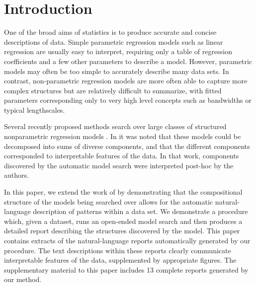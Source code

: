 \documentclass{article}
\def\ie{i.e.\ }
\def\eg{e.g.\ }
\begin{document}
\allowdisplaybreaks

\section{Introduction}

One of the broad aims of statistics is to produce accurate and concise descriptions of data.
Simple parametric regression models such as linear regression are usually easy to interpret, requiring only a table of regression coefficients and a few other parameters to describe a model.
However, parametric models may often be too simple to accurately describe many data sets.
In contrast, non-parametric regression models are more often able to capture more complex structures but are relatively difficult to summarize, with fitted parameters corresponding only to very high level concepts such as bandwidths or typical lengthscales.

Several recently proposed methods search over large classes of structured nonparametric regression models \citep[e.g.][]{diosan2007evolving, bing2010gp, DuvLloGroetal13, kronberger2013evolution}.
In \cite{DuvLloGroetal13} it was noted that these models could be decomposed into sums of diverse components, and that the different components corresponded to interpretable features of the data.
In that work, components discovered by the automatic model search were interpreted post-hoc by the authors.

In this paper, we extend the work of \cite{DuvLloGroetal13} by demonstrating that the compositional structure of the models being searched over allows for the automatic natural-language description of patterns within a data set.
We demonstrate a procedure which, given a dataset, runs an open-ended model search and then produces a detailed report describing the structures discovered by the model. %
%
This paper contains extracts of the natural-language reports automatically generated by our procedure.
The text descriptions within these reports clearly communicate interpretable features of the data, supplemented by appropriate figures.
The supplementary material to this paper includes 13 complete reports generated by our method.
\end{document}
